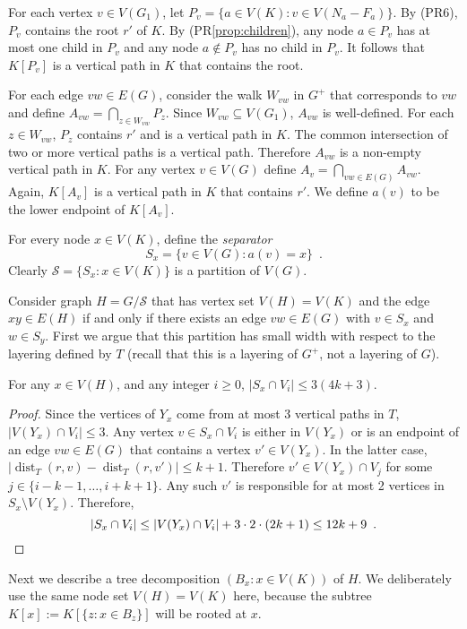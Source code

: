 \documentclass{patmorin}
\DeclareMathOperator{\dist}{dist}
\renewcommand{\propref}[1]{(PR\ref{prop:#1})}
\begin{document}
For each vertex $v\in V(G_1)$, let $P_v=\{a\in V(K): v\in V(N_a-F_a)\}$.  
By (PR6), $P_{v}$ contains the root $r'$ of $K$.  By \propref{children}, any node $a\in P_{v}$ has at most one child in $P_{v}$ and any node $a\not\in P_{v}$ has no child in $P_{v}$.  It follows that $K[P_{v}]$ is a vertical path in $K$ that contains the root.  

For each edge $vw\in E(G)$, consider the walk $W_{vw}$ in $G^+$ that corresponds to $vw$ and define $A_{vw}=\bigcap_{z\in W_{vw}} P_z$.  Since $W_{vw}\subseteq V(G_1)$, $A_{vw}$ is well-defined.  For each $z\in W_{vw}$, $P_{z}$ contains $r'$ and is a vertical path in $K$.  The common intersection of two or more vertical paths is a vertical path.  Therefore $A_{vw}$ is a non-empty vertical path in $K$.  For any vertex $v\in V(G)$ define $A_v=\bigcap_{vw\in E(G)} A_{vw}$.  Again, $K[A_v]$ is a vertical path in $K$ that contains $r'$.  We define $a(v)$ to be the lower endpoint of $K[A_v]$.

For every node $x\in V(K)$, define the \emph{separator}
\[
   S_x = \{v\in V(G): a(v)=x \} \enspace .
\]
Clearly $\mathcal{S}=\{S_x:x\in V(K)\}$ is a partition of $V(G)$.

Consider graph $H=G/\mathcal{S}$ that has vertex set $V(H)=V(K)$ and the edge $xy\in E(H)$ if and only if there exists an edge $vw\in E(G)$ with $v\in S_x$ and $w\in S_y$.  First we argue that this partition has small width with respect to the layering defined by $T$ (recall that this is a layering of $G^+$, not a layering of $G$).

\begin{clm}
  For any $x\in V(H)$, and any integer $i\ge 0$, $|S_x\cap V_i|\le 3(4k+3)$.
\end{clm}

\begin{proof}
  Since the vertices of $Y_x$ come from at most 3 vertical paths in $T$, $|V(Y_x)\cap V_i|\le 3$.  Any vertex $v\in S_x\cap V_i$ is either in $V(Y_x)$ or is an endpoint of an edge $vw\in E(G)$ that contains a vertex $v'\in V(Y_x)$.  In the latter case, $|\dist_T(r,v)-\dist_T(r, v')|\le k+1$.  Therefore $v'\in V(Y_x)\cap V_{j}$ for some $j\in\{i-k-1,\ldots,i+k+1\}$.   Any such $v'$ is responsible for at most 2 vertices in $S_x\setminus V(Y_x)$. Therefore,
  \[  |S_x\cap V_i| \le |V(Y_x)\cap V_i| + 3\cdot 2\cdot (2k+1) \le 12k+9 \enspace . \qedhere \]
\end{proof}

Next we describe a tree decomposition $(B_x:x\in V(K))$ of $H$.  We deliberately use the same node set $V(H)=V(K)$ here, because the subtree $K[x]:=K[\{z:x\in B_z\}]$ will be rooted at $x$.  
\end{document}
